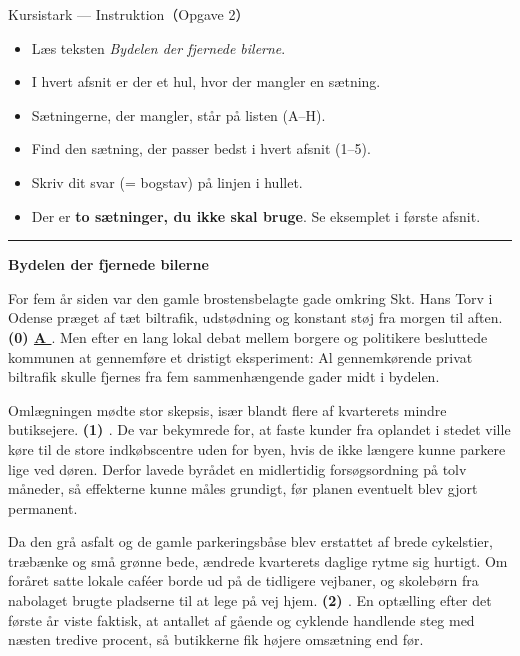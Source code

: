 \begin{emailbox}{Kursistark --- Instruktion（Opgave 2）}
\begin{itemize}
  \item Læs teksten \textit{Bydelen der fjernede bilerne}.
  \item I hvert afsnit er der et hul, hvor der mangler en sætning.
  \item Sætningerne, der mangler, står på listen (A--H).
  \item Find den sætning, der passer bedst i hvert afsnit (1--5).
  \item Skriv dit svar (= bogstav) på linjen i hullet.
  \item Der er \textbf{to sætninger, du ikke skal bruge}. Se eksemplet i første afsnit.
\end{itemize}

\vspace{0.35em}
\hrule
\vspace{0.45em}

\textbf{\color{NCDNavy}Bydelen der fjernede bilerne}

\vspace{0.3em}
For fem år siden var den gamle brostensbelagte gade omkring Skt. Hans Torv i Odense præget af tæt biltrafik, udstødning og konstant støj fra morgen til aften. \textbf{(0) \underline{\quad A \quad}}. Men efter en lang lokal debat mellem borgere og politikere besluttede kommunen at gennemføre et dristigt eksperiment: Al gennemkørende privat biltrafik skulle fjernes fra fem sammenhængende gader midt i bydelen.

\vspace{0.25em}
Omlægningen mødte stor skepsis, især blandt flere af kvarterets mindre butiksejere. \textbf{(1) \underline{\hspace{2.1cm}}}. De var bekymrede for, at faste kunder fra oplandet i stedet ville køre til de store indkøbscentre uden for byen, hvis de ikke længere kunne parkere lige ved døren. Derfor lavede byrådet en midlertidig forsøgsordning på tolv måneder, så effekterne kunne måles grundigt, før planen eventuelt blev gjort permanent.

\vspace{0.25em}
Da den grå asfalt og de gamle parkeringsbåse blev erstattet af brede cykelstier, træbænke og små grønne bede, ændrede kvarterets daglige rytme sig hurtigt. Om foråret satte lokale caféer borde ud på de tidligere vejbaner, og skolebørn fra nabolaget brugte pladserne til at lege på vej hjem. \textbf{(2) \underline{\hspace{2.1cm}}}. En optælling efter det første år viste faktisk, at antallet af gående og cyklende handlende steg med næsten tredive procent, så butikkerne fik højere omsætning end før.


\end{emailbox}
